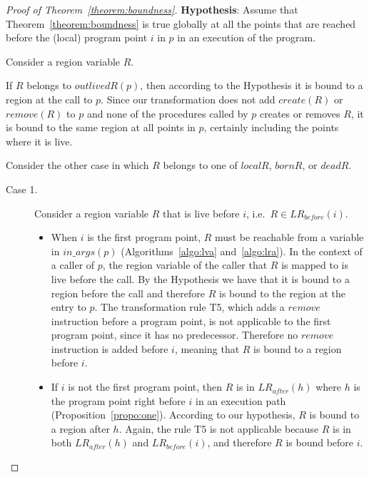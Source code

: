 \documentclass{tlp}
\newcommand{\inargs}[1]{\ensuremath{\mathit{in\_args}(#1)}}
\newcommand{\LRb}[1]{\ensuremath{\mathit{LR}_{before}(#1)}}
\newcommand{\LRa}[1]{\ensuremath{\mathit{LR}_{after}(#1)}}
\newcommand{\outlivedR}[1]{\ensuremath{{outlivedR}(#1)}}
\def\bornRegs{\mathit{bornR}}
\def\deadRegs{\mathit{deadR}}
\def\localRegs{\mathit{localR}}
\newcommand{\create}[1]{\ensuremath{{create}(#1)}}
\newcommand{\remove}[1]{\ensuremath{{remove}(#1)}}
\begin{document}
\begin{proof}[Proof of Theorem~\ref{theorem:boundness}]
\textbf{Hypothesis}:
Assume that Theorem~\ref{theorem:boundness} is true globally at all the
points that are reached before the (local) program point $i$ in $p$
in an execution of the program.

Consider a region variable $R$.

If $R$ belongs to \outlivedR{p},
then according to the Hypothesis
it is bound to a region at the call to $p$.
Since our transformation does not add \create{R} or \remove{R} to $p$
and none of the procedures called by $p$ creates or removes $R$,
it is bound to the same region at all points in $p$,
certainly including the points where it is live.

Consider the other case in which $R$ belongs
to one of $\localRegs$, $\bornRegs$, or $\deadRegs$.

\begin{description}
\item[Case 1.]
    Consider a region variable $R$ that is live before $i$,
    i.e.\ $R \in \LRb{i}$.

    \begin{itemize}
    \item
        When $i$ is the first program point,
        $R$ must be reachable from a variable in \inargs{p}
        (Algorithms~\ref{algo:lva} and~\ref{algo:lra}).
        In the context of a caller of $p$,
        the region variable of the caller that $R$ is mapped to
        is live before the call.
        By the Hypothesis we have that
        it is bound to a region before the call
        and therefore $R$ is bound to the region at the entry to $p$.
        The transformation rule T5,
        which adds a ${remove}$ instruction
        before a program point,
        is not applicable to the first program point,
        since it has no predecessor.
        Therefore no ${remove}$ instruction is added before $i$,
        meaning that $R$ is bound to a region before $i$.

    \item
        If $i$ is not the first program point,
        then $R$ is in \LRa{h}
        where $h$ is the program point right before $i$
        in an execution path (Proposition~\ref{propo:one}).
        According to our hypothesis,
        $R$ is bound to a region after $h$.
        Again, the rule T5 is not applicable
        because $R$ is in both \LRa{h} and \LRb{i},
        and therefore $R$ is bound before $i$.
    \end{itemize}


\end{description}
\end{proof}
\end{document}
